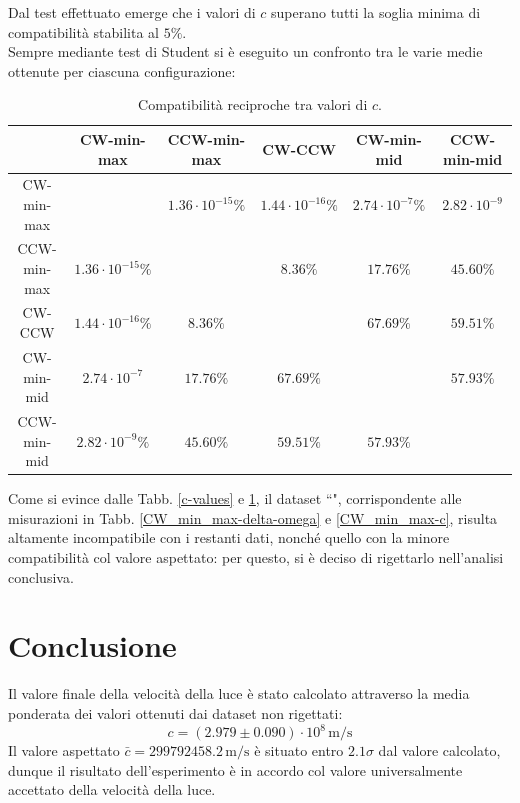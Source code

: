 \documentclass[]{article}
\let\oldsection\section%
\renewcommand{\section}{%
	\renewcommand{\theequation}{\thesection.\arabic{equation}}%
	\oldsection}%
\newcommand{\virgolette}[1]{``\text{#1}"}
\begin{document}
    Dal test effettuato emerge che i valori di $c$ superano tutti la soglia minima di compatibilità stabilita al $5\%$. \\
    Sempre mediante test di Student si è eseguito un confronto tra le varie medie ottenute per ciascuna configurazione:

    \begin{table}[H]
        \centering
        \begin{tabular}{||c|c|c|c|c|c||}
            \hline
            $ $ & CW-min-max & CCW-min-max & CW-CCW & CW-min-mid & CCW-min-mid \\
            \hline\hline
            CW-min-max & $ $ & $ 1.36\cdot 10^{-15}\% $ & $ 1.44\cdot 10^{-16}\% $ & $ 2.74\cdot 10^{-7}\% $ & $ 2.82\cdot 10^{-9} $ \\\hline
            CCW-min-max & $ 1.36\cdot 10^{-15}\% $ & $ $ & $ 8.36\% $ & $ 17.76\% $ & $ 45.60\% $ \\\hline
            CW-CCW & $ 1.44\cdot 10^{-16}\% $ & $ 8.36\% $ & $ $ & $ 67.69\% $ & $ 59.51\% $ \\\hline
            CW-min-mid & $ 2.74\cdot 10^{-7} $ & $ 17.76\% $ & $ 67.69\% $ & $ $ & $ 57.93\% $ \\\hline
            CCW-min-mid & $ 2.82\cdot 10^{-9}\% $ & $ 45.60\% $ & $ 59.51\% $ & $ 57.93\% $ & $ $ \\\hline
        \end{tabular}
        \caption{Compatibilità reciproche tra valori di $c$.}
        \label{comp}
    \end{table}

    Come si evince dalle Tabb. \ref{c-values} e \ref{comp}, il dataset \virgolette{CW-min-max}, corrispondente alle misurazioni in Tabb. \ref{CW_min_max-delta-omega} e \ref{CW_min_max-c}, risulta altamente incompatibile con i restanti dati, nonché quello con la minore compatibilità col valore aspettato: per questo, si è deciso di rigettarlo nell'analisi conclusiva.

    \section{Conclusione}
    
    Il valore finale della velocità della luce è stato calcolato attraverso la media ponderata dei valori ottenuti dai dataset non rigettati:
    \begin{equation}
        \label{final-value}
        c = \left( 2.979 \pm 0.090 \right) \cdot 10^8 \, \text{m/s}
    \end{equation}
    Il valore aspettato $\bar{c} = 299792458.2 \,\text{m/s}$ è situato entro $2.1\sigma$ dal valore calcolato, dunque il risultato dell'esperimento è in accordo col valore universalmente accettato della velocità della luce.
\end{document}
